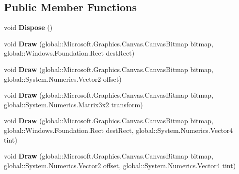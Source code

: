 \subsection*{Public Member Functions}
\begin{DoxyCompactItemize}
\item 
\mbox{\label{class_microsoft_1_1_graphics_1_1_canvas_1_1_canvas_sprite_batch_af897e58d6cf8ed4ca4efaee7c5f9a12a}} 
void {\bfseries Dispose} ()
\item 
\mbox{\label{class_microsoft_1_1_graphics_1_1_canvas_1_1_canvas_sprite_batch_a5b0eff0bf7714bbaebd5c698e9a4926d}} 
void {\bfseries Draw} (global\+::\+Microsoft.\+Graphics.\+Canvas.\+Canvas\+Bitmap bitmap, global\+::\+Windows.\+Foundation.\+Rect dest\+Rect)
\item 
\mbox{\label{class_microsoft_1_1_graphics_1_1_canvas_1_1_canvas_sprite_batch_a8d4101527222c749dcfd590c5306aeb7}} 
void {\bfseries Draw} (global\+::\+Microsoft.\+Graphics.\+Canvas.\+Canvas\+Bitmap bitmap, global\+::\+System.\+Numerics.\+Vector2 offset)
\item 
\mbox{\label{class_microsoft_1_1_graphics_1_1_canvas_1_1_canvas_sprite_batch_a65cba582c2a39f5ba39b6b335f662889}} 
void {\bfseries Draw} (global\+::\+Microsoft.\+Graphics.\+Canvas.\+Canvas\+Bitmap bitmap, global\+::\+System.\+Numerics.\+Matrix3x2 transform)
\item 
\mbox{\label{class_microsoft_1_1_graphics_1_1_canvas_1_1_canvas_sprite_batch_ac6a57c21e98d51e115cc80bfc708824f}} 
void {\bfseries Draw} (global\+::\+Microsoft.\+Graphics.\+Canvas.\+Canvas\+Bitmap bitmap, global\+::\+Windows.\+Foundation.\+Rect dest\+Rect, global\+::\+System.\+Numerics.\+Vector4 tint)
\item 
\mbox{\label{class_microsoft_1_1_graphics_1_1_canvas_1_1_canvas_sprite_batch_af83f6d164806efe2c3b5584aacf35266}} 
void {\bfseries Draw} (global\+::\+Microsoft.\+Graphics.\+Canvas.\+Canvas\+Bitmap bitmap, global\+::\+System.\+Numerics.\+Vector2 offset, global\+::\+System.\+Numerics.\+Vector4 tint)

\end{DoxyCompactItemize}
